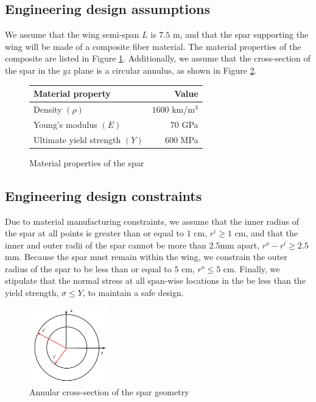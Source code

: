 \documentclass[11pt]{article}
\begin{document}
\subsection{Engineering design assumptions}

We assume that the wing semi-span $L$ is $7.5$ m,
and that the spar supporting the wing will be made
of a composite fiber material. The material properties
of the composite are listed in Figure \ref{fig:materials}.
Additionally, we assume that the cross-section of
the spar in the $yz$ plane is a circular annulus,
as shown in Figure \ref{fig:annulus}.

\begin{figure}[hbt]
\centering
\begin{tabular}{ | l | r  |}
\hline
Material property & Value \\ \hline
Density $(\rho)$ & $1600$ km/m$^3$ \\ \hline
Young's modulus $(E)$ & $70$ GPa \\ \hline
Ultimate yield strength $(Y)$ & $600$ MPa \\ \hline
\end{tabular}
\caption{Material properties of the spar}
\label{fig:materials}
\end{figure}

\subsection{Engineering design constraints}

Due to material manufacturing constraints, we
assume that the inner radius of the spar at all
points is greater than or equal to $1$ cm, $r^i \geq 1$ cm,
and that the inner and outer radii of the spar cannot be
more than $2.5$mm apart, $r^o - r^i \geq 2.5$ mm.
Because the spar must remain within the wing, we
constrain the outer radius of the spar to be less
than or equal to $5$ cm, $r^o \leq 5$ cm.
Finally, we stipulate that the normal stress at all
span-wise locations in the be less than the yield
strength, $\sigma \leq Y$, to maintain a safe design.

\begin{figure}[hbt]
\centering
\includegraphics[width=0.3\textwidth]{annulus}
\caption{Annular cross-section of the spar geometry}
\label{fig:annulus}
\end{figure}
\end{document}
